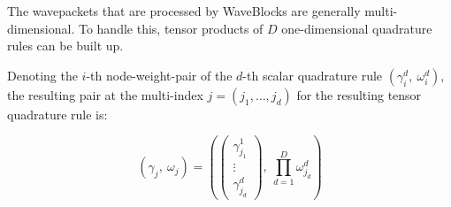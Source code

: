 The wavepackets that are processed by WaveBlocks are generally multi-dimensional.
To handle this, tensor products of $D$ one-dimensional quadrature rules can be
built up.

Denoting the $i$-th node-weight-pair of the $d$-th scalar quadrature rule
$(\gamma_i^d,\ \omega_i^d)$, the resulting pair at the multi-index $j = (j_1,
\ldots, j_d)$ for the resulting tensor quadrature rule is:

\begin{equation}
  (\gamma_j,\ \omega_j) = \left(
    \begin{pmatrix} \gamma_{j_1}^1 \\ \vdots \\ \gamma_{j_d}^d \end{pmatrix},
    \ \prod_{d=1}^D \omega_{j_d}^d
  \right)
\end{equation}
